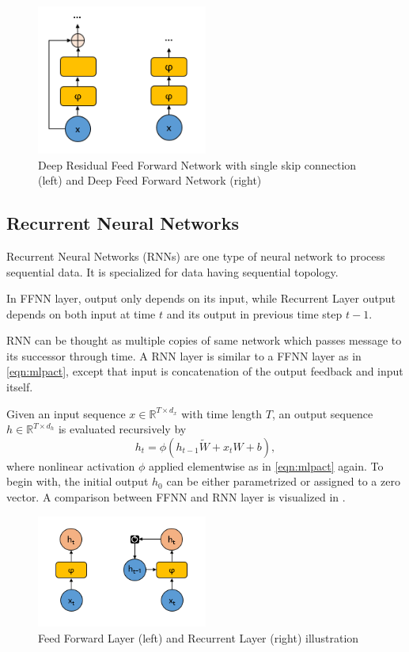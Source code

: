 \begin{figure}
	\centering
	\includegraphics[width=0.5\textwidth]{figures/ml_theory/rffnn_vs_ffnn.png}
	\caption{Deep Residual Feed Forward Network with single skip connection (left) and Deep Feed Forward Network (right)}
	\label{fig:rffnn_ffnn}
\end{figure}

\subsection{Recurrent Neural Networks}

Recurrent Neural Networks (RNNs) \cite{rumelhart_learning_1986} are one type of neural network to process sequential data. 
It is specialized for data having sequential topology. 

In FFNN layer, output only depends on its input, while Recurrent Layer output depends on both input at time $t$ and its output in previous time step $t-1$. 

RNN can be thought as multiple copies of same network which passes message to its successor through time. 
A RNN layer is similar to a FFNN layer as in \eqref{eqn:mlpact}, 
except that input is concatenation of the output feedback and input itself.

Given an input sequence $x \in \mathbb{R}^{T \times d_x}$ with time length $T$, an output sequence $h \in \mathbb{R}^{T \times d_h}$ is evaluated recursively by 
\begin{equation}
\label{eqn:rnnact}
h_t = \phi(h_{t-1} \tilde{W} + x_t W + b),
\end{equation}
where nonlinear activation $\phi$ applied elementwise as in \eqref{eqn:mlpact} again. 
To begin with, the initial output $h_0$ can be either parametrized or assigned to a zero vector. A comparison between FFNN and RNN layer is visualized in .

\begin{figure}
	\centering
	\includegraphics[width=0.5\textwidth]{figures/ml_theory/ffnn_vs_rnn.png}
	\caption{Feed Forward Layer (left) and Recurrent Layer (right) illustration~\cite{olah_understanding_2015}}
	\label{fig:rnn_vs_ffnn}
\end{figure}

